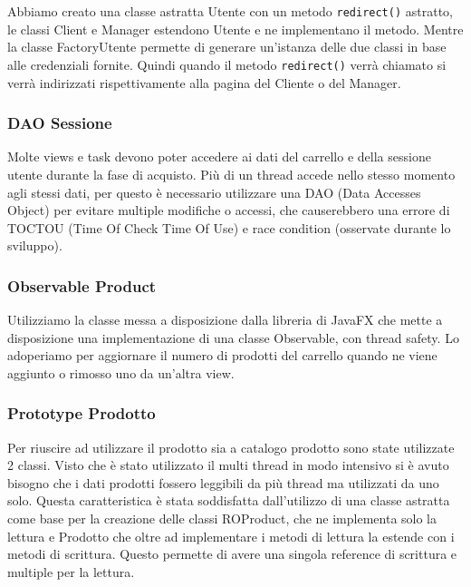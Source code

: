 \documentclass[12pt, a4paper]{report}
\begin{document}
Abbiamo creato una classe astratta Utente con un metodo \verb|redirect()|
astratto, le classi Client e Manager estendono Utente e ne implementano il
metodo. Mentre la classe FactoryUtente permette di generare un'istanza delle
due classi in base alle credenziali fornite. Quindi quando il metodo
\verb|redirect()| verrà chiamato si verrà indirizzati rispettivamente alla
pagina del Cliente o del Manager.

\subsubsection{DAO Sessione}

Molte views e task devono poter accedere ai dati del carrello e della sessione
utente durante la fase di acquisto. Più di un thread accede nello stesso
momento agli stessi dati, per questo è necessario utilizzare una DAO (Data
Accesses Object) per evitare multiple modifiche o accessi, che causerebbero una
errore di TOCTOU (Time Of Check Time Of Use) e race condition (osservate
durante lo sviluppo).

\subsubsection{Observable Product}

Utilizziamo la classe messa a disposizione dalla libreria di JavaFX che mette
a disposizione una implementazione di una classe Observable, con thread safety.
Lo adoperiamo per aggiornare il numero di prodotti del carrello quando ne viene
aggiunto o rimosso uno da un'altra view.

\newpage

\subsubsection{Prototype Prodotto}

Per riuscire ad utilizzare il prodotto sia a catalogo prodotto sono state
utilizzate 2 classi. Visto che è stato utilizzato il multi thread in modo
intensivo si è avuto bisogno che i dati prodotti fossero leggibili da più
thread ma utilizzati da uno solo. Questa caratteristica è stata soddisfatta
dall'utilizzo di una classe astratta come base per la creazione delle classi
ROProduct, che ne implementa solo la lettura e Prodotto che oltre ad
implementare i metodi di lettura la estende con i metodi di scrittura. Questo
permette di avere una singola reference di scrittura e multiple per la lettura.
\end{document}
